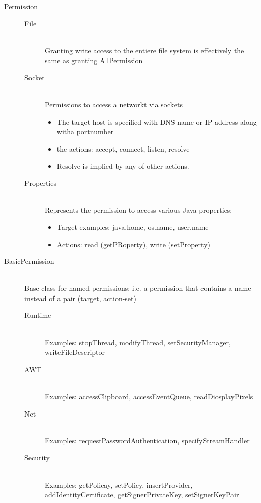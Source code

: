 \documentclass[10pt]{article}
\begin{document}
\begin{description}
	\item[Permission] \hfill
		\begin{description}
			\item[File] \hfill \\
				Granting write access to the entiere file system is effectively the same as granting AllPermission
			\item[Socket] \hfill \\
				Permissions to access a networkt via sockets
				\begin{itemize}
					\item The target host is specified with DNS name or IP address along witha  portnumber
					\item the actions: accept, connect, listen, resolve
					\item Resolve is implied by any of other actions.
				\end{itemize}
			\item[Properties] \hfill \\
				Represents the permission to access various Java properties:
				\begin{itemize}
					\item Target examples: java.home, os.name, user.name
					\item Actions: read (getPRoperty), write (setProperty)
				\end{itemize}
		\end{description}
	\item[BasicPermission] \hfill \\
		Base class for named permissions: i.e. a permission that contains a name instead of a pair (target, action-set)
		\begin{description}
			\item[Runtime] \hfill \\
				Examples: stopThread, modifyThread, setSecurityManager, writeFileDescriptor
			\item[AWT] \hfill \\
				Examples: accessClipboard, accessEventQueue, readDiosplayPixels
			\item[Net] \hfill \\
				Examples: requestPasswordAuthentication, specifyStreamHandler
			\item[Security] \hfill \\
				Examples: getPolicay, setPolicy, insertProvider, addIdentityCertificate, getSignerPrivateKey, setSignerKeyPair
		\end{description}
\end{description}
\end{document}
